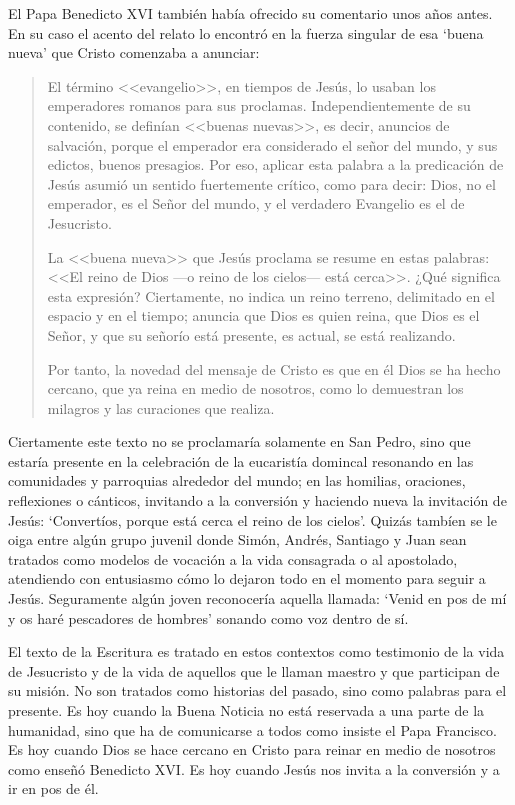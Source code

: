 El Papa Benedicto XVI también había ofrecido su comentario unos años antes. En su caso el acento del relato lo encontró en la fuerza singular de esa `buena nueva' que Cristo comenzaba a anunciar:
\blockquote[{\cite{benedicto2008angelus}}]{El término <<evangelio>>, en tiempos de Jesús, lo usaban los emperadores romanos para sus proclamas. Independientemente de su contenido, se definían <<buenas nuevas>>, es decir, anuncios de salvación, porque el emperador era considerado el señor del mundo, y sus edictos, buenos presagios. Por eso, aplicar esta palabra a la predicación de Jesús asumió un sentido fuertemente crítico, como para decir: Dios, no el emperador, es el Señor del mundo, y el verdadero Evangelio es el de Jesucristo.

La <<buena nueva>> que Jesús proclama se resume en estas palabras: <<El reino de Dios ---o reino de los cielos--- está cerca>>. ¿Qué significa esta expresión? Ciertamente, no indica un reino terreno, delimitado en el espacio y en el tiempo; anuncia que Dios es quien reina, que Dios es el Señor, y que su señorío está presente, es actual, se está realizando.

Por tanto, la novedad del mensaje de Cristo es que en él Dios se ha hecho cercano, que ya reina en medio de nosotros, como lo demuestran los milagros y las curaciones que realiza.}

Ciertamente este texto no se proclamaría solamente en San Pedro, sino que estaría presente en la celebración de la eucaristía domincal resonando en las comunidades y parroquias alrededor del mundo; en las homilias, oraciones, reflexiones o cánticos, invitando a la conversión y haciendo nueva la invitación de Jesús: \enquote*{Convertíos, porque está cerca el reino de los cielos}. Quizás tambíen se le oiga entre algún grupo juvenil donde Simón, Andrés, Santiago y Juan sean tratados como modelos de vocación a la vida consagrada o al apostolado, atendiendo con entusiasmo cómo lo dejaron todo en el momento para seguir a Jesús. Seguramente algún joven reconocería aquella llamada: \enquote*{Venid en pos de mí y os haré pescadores de hombres} sonando como voz dentro de sí.

El texto de la Escritura es tratado en estos contextos como testimonio de la vida de Jesucristo y de la vida de aquellos que le llaman maestro y que participan de su misión. No son tratados como historias del pasado, sino como palabras para el presente. Es hoy cuando la Buena Noticia no está reservada a una parte de la humanidad, sino que ha de comunicarse a todos como insiste el Papa Francisco. Es hoy cuando Dios se hace cercano en Cristo para reinar en medio de nosotros como enseñó Benedicto XVI. Es hoy cuando Jesús nos invita a la conversión y a ir en pos de él.

